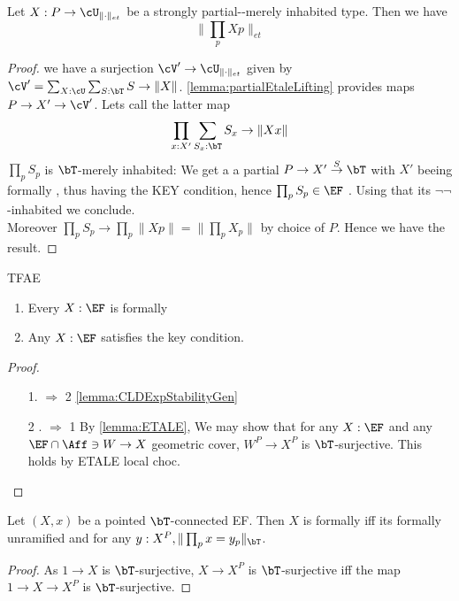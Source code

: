 \begin{lemma}
	Let $X : P \to \cU_{\|\cdot\|_{et}}$ be a strongly partial-\etale \etale-merely inhabited type. %
	Then we have 
	\[
	\|\prod_p X p\|_{et}
	\]
\end{lemma}
\begin{proof}
	we have a surjection $\cV' \to \cU_{\|\cdot\|_{et}}$ given by $\cV' = \sum_{X: \cU} \sum_{S: \bT} S \to \|X\|$.
	\ref{lemma:partialEtaleLifting} provides maps $P \to X' \to \cV'$. Lets call the latter map
	\[\prod_{x : X'} \sum_{S_x: \bT} S_x \to \|X x\| \]
	$\prod_p S_p$ is $\bT$-merely inhabited: We get a a partial \etale $P \to X' \overset{S}{\to} \bT$ with $X'$ beeing formally \etale, thus having the KEY condition, hence $\prod_p S_p \in \EF$ . Using that its $\lnot \lnot$-inhabited we conclude. \\
	Moreover $\prod_p S_p \to \prod_p \|X p\| = \|\prod_p X_p \|$ by choice of $P$. Hence we have the result.
\end{proof}

\begin{lemma}[TODO]
	TFAE
	\begin{enumerate}
		\item 	Every $X : \EF$ is formally \etale
		\item Any $X : \EF$ satisfies the key condition.
	\end{enumerate}
\end{lemma}
\begin{proof}
	\begin{enumerate}
		\item [1. $\Rightarrow$ 2] \ref{lemma:CLDExpStabilityGen}
		\item [2 . $\Rightarrow$ 1] By \ref{lemma:ETALE}, We may show that for any $X : \EF$ and any $\EF \cap \Aff \ni W \to X$ geometric cover, $W^P \to X^P$ is $\bT$-surjective. This holds by ETALE local choc. %
		
	\end{enumerate}
\end{proof}
\begin{lemma}
	Let $(X, x)$ be a pointed $\bT$-connected EF. Then $X$ is formally \etale iff its  formally unramified and for any $y : X^P , \|\prod_p x = y_p \|_\bT$. %
\end{lemma}
\begin{proof}
	As $1 \to X$ is $\bT$-surjective, $X \to X^P$ is $\bT$-surjective iff the map $1 \to X \to X^P$ is $\bT$-surjective.
\end{proof}

